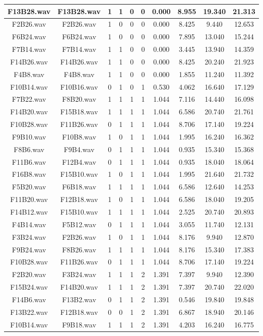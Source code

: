\documentclass[11pt,a4paper]{book}
\begin{document}
\begin{longtable}[c]{|c|c|c|c|c|c|c|c|c|c|}
		F13B28.wav&F13B28.wav&1&1&0&0&0.000&8.955&19.340&21.313\\ \hline
F2B26.wav&F2B26.wav&1&0&0&0&0.000&8.425&9.440&12.653\\ \hline
F6B24.wav&F6B24.wav&1&0&0&0&0.000&7.895&13.040&15.244\\ \hline
F7B14.wav&F7B14.wav&1&1&0&0&0.000&3.445&13.940&14.359\\ \hline
F14B26.wav&F14B26.wav&1&1&0&0&0.000&8.425&20.240&21.923\\ \hline
F4B8.wav&F4B8.wav&1&1&0&0&0.000&1.855&11.240&11.392\\ \hline
F10B14.wav&F10B16.wav&0&1&0&1&0.530&4.062&16.640&17.129\\ \hline
F7B22.wav&F8B20.wav&1&1&1&1&1.044&7.116&14.440&16.098\\ \hline
F14B20.wav&F15B18.wav&1&1&1&1&1.044&6.586&20.740&21.761\\ \hline
F10B28.wav&F11B26.wav&0&1&1&1&1.044&8.706&17.140&19.224\\ \hline
F9B10.wav&F10B8.wav&1&0&1&1&1.044&1.995&16.240&16.362\\ \hline
F8B6.wav&F9B4.wav&0&1&1&1&1.044&0.935&15.340&15.368\\ \hline
F11B6.wav&F12B4.wav&0&1&1&1&1.044&0.935&18.040&18.064\\ \hline
F16B8.wav&F15B10.wav&1&0&1&1&1.044&1.995&21.640&21.732\\ \hline
F5B20.wav&F6B18.wav&1&1&1&1&1.044&6.586&12.640&14.253\\ \hline
F11B20.wav&F12B18.wav&1&0&1&1&1.044&6.586&18.040&19.205\\ \hline
F14B12.wav&F15B10.wav&1&1&1&1&1.044&2.525&20.740&20.893\\ \hline
F4B14.wav&F5B12.wav&0&1&1&1&1.044&3.055&11.740&12.131\\ \hline
F3B24.wav&F2B26.wav&1&0&1&1&1.044&8.176&9.940&12.870\\ \hline
F9B24.wav&F8B26.wav&1&1&1&1&1.044&8.176&15.340&17.383\\ \hline
F10B28.wav&F11B26.wav&0&1&1&1&1.044&8.706&17.140&19.224\\ \hline
F2B20.wav&F3B24.wav&1&1&1&2&1.391&7.397&9.940&12.390\\ \hline
F15B24.wav&F14B20.wav&1&1&1&2&1.391&7.397&20.740&22.020\\ \hline
F14B6.wav&F13B2.wav&0&1&1&2&1.391&0.546&19.840&19.848\\ \hline
F13B22.wav&F12B18.wav&0&0&1&2&1.391&6.867&18.940&20.146\\ \hline
F10B14.wav&F9B18.wav&1&1&1&2&1.391&4.203&16.240&16.775\\ \hline

\end{longtable}
\end{document}
